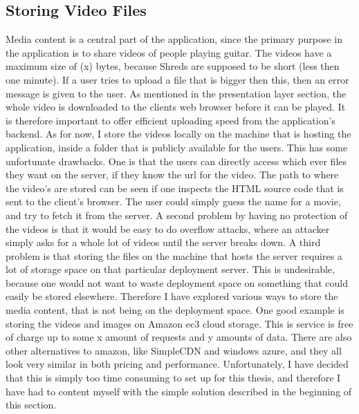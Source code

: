\subsection{Storing Video Files}
Media content is a central part of the application, since the primary purpose in the application is to share videos of people playing guitar. The videos have a maximum size of (x) bytes, because Shreds are supposed to be short (less then one minute). If a user tries to upload a file that is bigger then this, then an error message is given to the user. 
	As mentioned in the presentation layer section, the whole video is downloaded to the clients web browser before it can be played. It is therefore important to offer efficient uploading speed from the application's backend. As for now, I store the videos locally on the machine that is hosting the application, inside a folder that is publicly available for the users. This has some unfortunate drawbacks. One is that the users can directly access which ever files they want on the server, if they know the url for the video. The path to where the video's are stored can be seen if one inspects the HTML source code that is sent to the client's browser. The user could simply guess the name for a movie, and try to fetch it from the server. A second problem by having no protection of the videos is that it would be easy to do overflow attacks, where an attacker simply asks for a whole lot of videos until the server breaks down. A third problem is that storing the files on the machine that hosts the server requires a lot of storage space on that particular deployment server. This is undesirable, because one would not want to waste deployment space on something that could easily be stored elsewhere. Therefore I have explored various ways to store the media content, that is not being on the deployment space. One good example is storing the videos and images on  Amazon ec3 cloud storage. This is service is free of charge up to some x amount of requests and y amounts of data. There are also other alternatives to amazon, like SimpleCDN and windows azure, and they all look very similar in both pricing and performance. Unfortunately, I have decided that this is simply too time consuming to set up for this thesis, and therefore I have had to content myself with the simple solution described in the beginning of this section.
	
